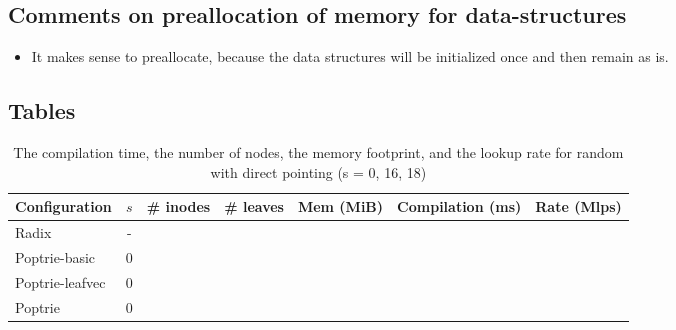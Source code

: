 \documentclass{article}
\begin{document}
\subsection{Comments on preallocation of memory for data-structures}
\begin{itemize}
    \item It makes sense to preallocate, because the data
    structures will be initialized once and then remain as is.
\end{itemize}

\subsection{Tables}
\begin{table}
    \begin{center}
        \begin{tabular}{|l|c|c|c|c|c|c|}
            \hline
            Configuration   & $s$ & \# inodes & \# leaves & Mem (MiB) & Compilation (ms) & Rate (Mlps) \\ 
            \hline
            Radix           & -   & & & & & \\ 
            \hline                           
            Poptrie-basic   & $0$ & & & & & \\  
            \hline                           
            Poptrie-leafvec & $0$ & & & & & \\
            \hline
            Poptrie         & $0$ & & & & & \\
            \hline
        \end{tabular}
    \end{center}
    \caption{The compilation time, the number of nodes, the memory footprint, and the lookup rate for
random with direct pointing (s = 0, 16, 18)}
\end{table}
\end{document}
